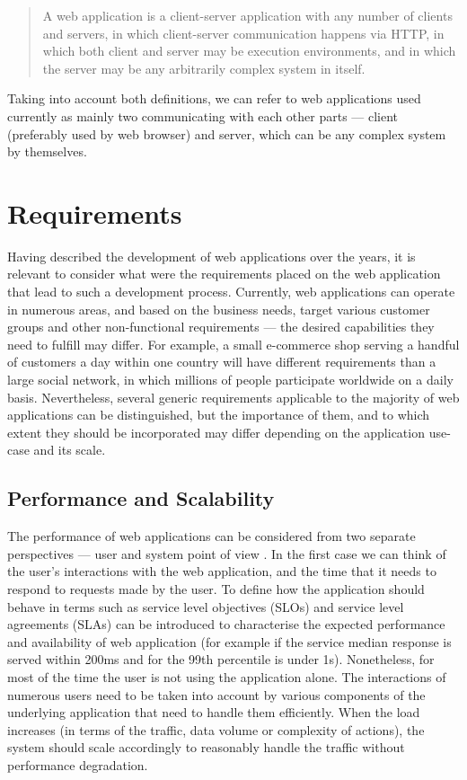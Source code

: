 \begin{quotation}
A web application is a client-server application with any number of clients and servers, in which client-server communication happens via HTTP, in which both client and server may be execution environments, and in which the server may be any arbitrarily complex system in itself.
\end{quotation}

Taking into account both definitions, we can refer to web applications used currently as mainly two communicating with each other parts --- client (preferably used by web browser) and server, which can be any complex system by themselves.

\section{Requirements} \label{section:web-apps-requirements}

Having described the development of web applications over the years, it is relevant to consider what were the requirements placed on the web application that lead to such a development process. Currently, web applications can operate in numerous areas, and based on the business needs, target various customer groups and other non-functional requirements --- the desired capabilities they need to fulfill may differ. For example, a small e-commerce shop serving a handful of customers a day within one country will have different requirements than a large social network, in which millions of people participate worldwide on a daily basis. Nevertheless, several generic requirements applicable to the majority of web applications can be distinguished, but the importance of them, and to which extent they should be incorporated may differ depending on the application use-case and its scale.

\subsection*{Performance and Scalability}

The performance of web applications can be considered from two separate perspectives --- user and system point of view \cite{DesignDataIntensiveApplications}. In the first case we can think of the user's interactions with the web application, and the time that it needs to respond to requests made by the user. To define how the application should behave in terms such as service level objectives (SLOs) and service level agreements (SLAs) can be introduced to characterise the expected performance and availability of web application (for example if the service median response is served within 200ms and for the 99th percentile is under 1s). Nonetheless, for most of the time the user is not using the application alone. The interactions of numerous users need to be taken into account by various components of the underlying application that need to handle them efficiently. When the load increases (in terms of the traffic, data volume or complexity of actions), the system should scale accordingly to reasonably handle the traffic without performance degradation. 

